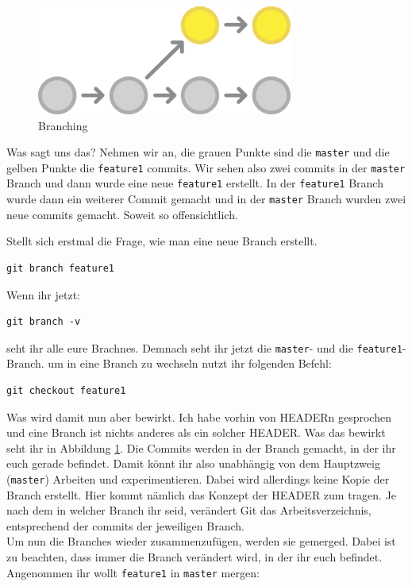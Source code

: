 \documentclass[a4paper,11pt]{scrartcl}	%
\begin{document}
		\begin{figure}[H]
			\centering
			\includegraphics[width=0.75\textwidth]{img/branch.png}
			\caption{Branching}
			\label{img:branch}
		\end{figure}

	Was sagt uns das? Nehmen wir an, die grauen Punkte sind die \texttt{master} und die gelben Punkte die \texttt{feature1}
	commits. Wir sehen also zwei commits in der \texttt{master} Branch und dann wurde eine neue \texttt{feature1} erstellt.
	In der \texttt{feature1} Branch wurde dann ein weiterer Commit gemacht und in der \texttt{master} Branch wurden zwei 
	neue commits gemacht. Soweit so offensichtlich.\par
	Stellt sich erstmal die Frage, wie man eine neue Branch erstellt.

		\begin{lstlisting}[frame=single]
git branch feature1
		\end{lstlisting}

	Wenn ihr jetzt: 

		\begin{lstlisting}[frame=single]
git branch -v
		\end{lstlisting}

	seht ihr alle eure Brachnes. Demnach seht ihr jetzt die \texttt{master}- und die \texttt{feature1}-Branch.
	um in eine Branch zu wechseln nutzt ihr folgenden Befehl:

		\begin{lstlisting}[frame=single]
git checkout feature1
		\end{lstlisting}

	Was wird damit nun aber bewirkt. Ich habe vorhin von HEADERn gesprochen und eine Branch ist nichts anderes als ein
	solcher HEADER. Was das bewirkt seht ihr in Abbildung \ref{img:branch}. Die Commits werden in der Branch gemacht, in 
	der ihr euch gerade befindet. Damit könnt ihr also unabhängig von dem Hauptzweig (\texttt{master}) Arbeiten und
	experimentieren. Dabei wird allerdings keine Kopie der Branch erstellt. Hier kommt nämlich das Konzept der HEADER
	zum tragen. Je nach dem in welcher Branch ihr seid, verändert Git das Arbeitsverzeichnis, entsprechend der commits
	der jeweiligen Branch.\\[0.5cm]
	Um nun die Branches wieder zusammenzufügen, werden sie gemerged. Dabei ist zu beachten, dass immer die Branch verändert
	wird, in der ihr euch befindet. Angenommen ihr wollt \texttt{feature1} in \texttt{master} mergen:
\end{document}
